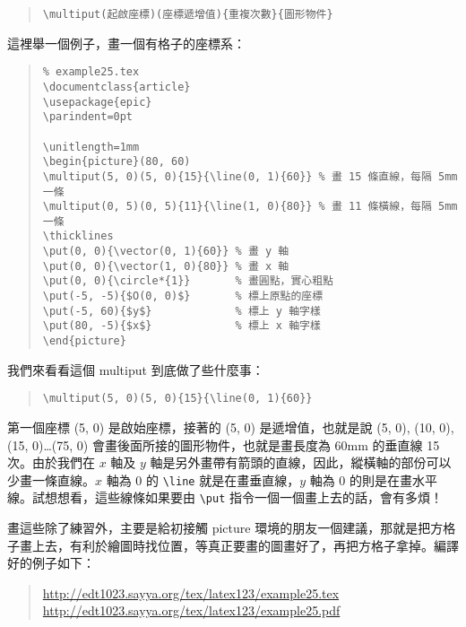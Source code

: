 \begin{quote}
  \begin{verbatim}
\multiput(起啟座標)(座標遞增值){重複次數}{圖形物件}
\end{verbatim}
\end{quote}

這裡舉一個例子，畫一個有格子的座標系：

\begin{quote}
  \begin{verbatim}
% example25.tex
\documentclass{article}
\usepackage{epic}
\parindent=0pt

\unitlength=1mm
\begin{picture}(80, 60)
\multiput(5, 0)(5, 0){15}{\line(0, 1){60}} % 畫 15 條直線，每隔 5mm 一條
\multiput(0, 5)(0, 5){11}{\line(1, 0){80}} % 畫 11 條橫線，每隔 5mm 一條
\thicklines
\put(0, 0){\vector(0, 1){60}} % 畫 y 軸
\put(0, 0){\vector(1, 0){80}} % 畫 x 軸
\put(0, 0){\circle*{1}}       % 畫圓點，實心粗點
\put(-5, -5){$O(0, 0)$}       % 標上原點的座標
\put(-5, 60){$y$}             % 標上 y 軸字樣
\put(80, -5){$x$}             % 標上 x 軸字樣
\end{picture}

\end{verbatim}
\end{quote}

我們來看看這個 {\ttfamily multiput} 到底做了些什麼事：

\begin{quote}
  \begin{verbatim}
\multiput(5, 0)(5, 0){15}{\line(0, 1){60}}
\end{verbatim}
\end{quote}

第一個座標 (5, 0) 是啟始座標，接著的 (5, 0) 是遞增值，也就是說 (5, 0), (10, 0), (15, 0)\ldots{}(75, 0) 會畫後面所接的圖形物件，也就是畫長度為 60mm 的垂直線 15 次。由於我們在 $x$ 軸及 $y$ 軸是另外畫帶有箭頭的直線，因此，縱橫軸的部份可以少畫一條直線。$x$ 軸為 0 的 \verb|\line| 就是在畫垂直線，$y$ 軸為 0 的則是在畫水平線。試想想看，這些線條如果要由 \verb|\put| 指令一個一個畫上去的話，會有多煩！

畫這些除了練習外，主要是給初接觸 {\ttfamily picture} 環境的朋友一個建議，那就是把方格子畫上去，有利於繪圖時找位置，等真正要畫的圖畫好了，再把方格子拿掉。編譯好的例子如下：

\begin{quote}
  \url{http://edt1023.sayya.org/tex/latex123/example25.tex}\\
  \url{http://edt1023.sayya.org/tex/latex123/example25.pdf}
\end{quote}


